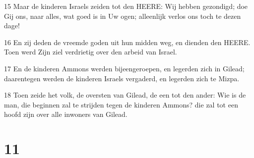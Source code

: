 \par 15 Maar de kinderen Israels zeiden tot den HEERE: Wij hebben gezondigd; doe Gij ons, naar alles, wat goed is in Uw ogen; alleenlijk verlos ons toch te dezen dage!
\par 16 En zij deden de vreemde goden uit hun midden weg, en dienden den HEERE. Toen werd Zijn ziel verdrietig over den arbeid van Israel.
\par 17 En de kinderen Ammons werden bijeengeroepen, en legerden zich in Gilead; daarentegen werden de kinderen Israels vergaderd, en legerden zich te Mizpa.
\par 18 Toen zeide het volk, de oversten van Gilead, de een tot den ander: Wie is de man, die beginnen zal te strijden tegen de kinderen Ammons? die zal tot een hoofd zijn over alle inwoners van Gilead.

\chapter{11}

